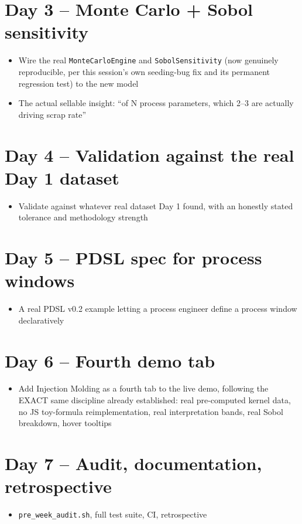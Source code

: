 \documentclass[11pt]{article}
\begin{document}
\section*{Day 3 -- Monte Carlo + Sobol sensitivity}
\begin{itemize}[leftmargin=*]
  \item Wire the real \texttt{MonteCarloEngine} and
    \texttt{SobolSensitivity} (now genuinely reproducible, per this
    session's own seeding-bug fix and its permanent regression test)
    to the new model
  \item The actual sellable insight: ``of N process parameters,
    which 2--3 are actually driving scrap rate''
\end{itemize}

\section*{Day 4 -- Validation against the real Day 1 dataset}
\begin{itemize}[leftmargin=*]
  \item Validate against whatever real dataset Day 1 found, with an
    honestly stated tolerance and methodology strength
\end{itemize}

\section*{Day 5 -- PDSL spec for process windows}
\begin{itemize}[leftmargin=*]
  \item A real PDSL v0.2 example letting a process engineer define a
    process window declaratively
\end{itemize}

\section*{Day 6 -- Fourth demo tab}
\begin{itemize}[leftmargin=*]
  \item Add Injection Molding as a fourth tab to the live demo,
    following the EXACT same discipline already established: real
    pre-computed kernel data, no JS toy-formula reimplementation,
    real interpretation bands, real Sobol breakdown, hover tooltips
\end{itemize}

\section*{Day 7 -- Audit, documentation, retrospective}
\begin{itemize}[leftmargin=*]
  \item \texttt{pre\_week\_audit.sh}, full test suite, CI, retrospective
\end{itemize}
\end{document}
